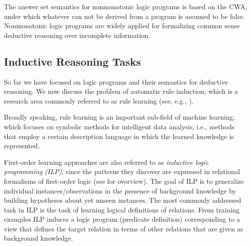The answer set semantics for nonmonotonic logic programs is based on the CWA, under which whatever can not be derived from a program is assumed to be false. Nonmonotonic logic programs are widely applied for formalizing common sense deductive reasoning over incomplete information.



\subsection{Inductive Reasoning Tasks}
\label{sec:rules_learning_tasks}

So far we have focused on logic programs and their semantics for deductive reasoning. We now discuss the problem of automatic rule induction, which is a research area commonly referred to as rule learning (see, e.g., \cite{DBLP:books/daglib/0021868,DBLP:series/cogtech/FurnkranzGL12}). 

Broadly speaking, rule learning is an important sub-field of machine learning, which focuses on symbolic methods for intelligent data analysis, i.e., methods that employ a certain description language in which the learned knowledge is represented. %

First-order learning approaches are also referred to as %
 \emph{inductive logic programming (ILP)}, since the patterns they discover are expressed in
relational formalisms of first-order logic (see \cite{DBLP:books/daglib/0021868} for overview).
The goal of ILP is to generalize individual instances/observations in the presence of background knowledge by building
hypotheses about yet unseen instances. The most commonly addressed task in ILP is the task
of learning logical definitions of relations. From training examples ILP induces a
logic program (predicate definition) corresponding to a view
that defines the target relation in terms of other relations
that are given as background knowledge. 

